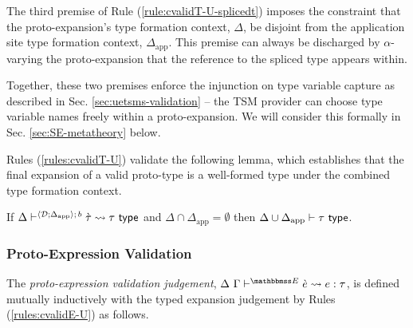 The third premise of Rule (\ref{rule:cvalidT-U-splicedt}) imposes the constraint that the proto-expansion's type formation context, $\Delta$, be disjoint from the application site type formation context, $\Delta_\text{app}$. This premise can always be discharged by $\alpha$-varying the proto-expansion that the reference to the spliced type appears within. 

Together, these two premises enforce the injunction on type variable capture as described in Sec. \ref{sec:uetsms-validation} -- the TSM provider can choose type variable names freely within a proto-expansion. We will consider this formally in Sec. \ref{sec:SE-metatheory} below. %

Rules (\ref{rules:cvalidT-U}) validate the following lemma, which establishes that the final expansion of a valid proto-type is a well-formed type under the combined type formation context.
\begingroup
\def\thetheorem{\ref{lemma:candidate-expansion-type-validation}}
\begin{lemma}
If $\Delta\vdash^{\langle \mathcal{D}; \Delta_\text{app} \rangle;\,b} \grave{\tau} \leadsto \tau~\mathsf{type}$ and $\Delta \cap \Delta_\text{app}=\emptyset$ then ${\Delta}\cup{\Delta_\text{app}} \vdash \tau~\mathsf{type}$.
\end{lemma}
\endgroup

\subsubsection{Proto-Expression Validation}
The \emph{proto-expression validation judgement}, $\cvalidE{\Delta}{\Gamma}{\escenev}{\ce}{e}{\tau}$, is defined mutually inductively with the typed expansion judgement by Rules (\ref{rules:cvalidE-U}) as follows.%

